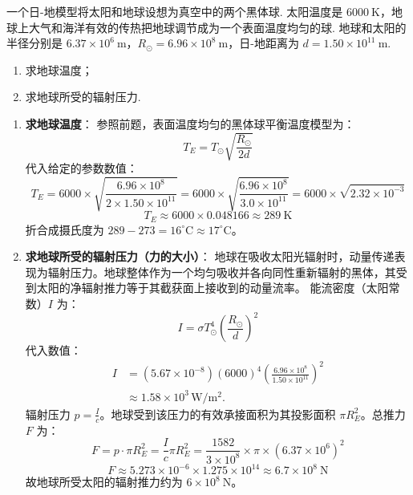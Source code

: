 \begin{exercise}\label{ex:13.13}
一个日-地模型将太阳和地球设想为真空中的两个黑体球. 太阳温度是 $6000 \ \mathrm{K}$，地球上大气和海洋有效的传热把地球调节成为一个表面温度均匀的球. 地球和太阳的半径分别是 $6.37 \times 10^6 \ \mathrm{m}$，$R_\odot = 6.96 \times 10^8 \ \mathrm{m}$，日-地距离为 $d = 1.50 \times 10^{11} \ \mathrm{m}$. 
\begin{enumerate}
  \item[(a)] 求地球温度；
  \item[(b)] 求地球所受的辐射压力.
\end{enumerate}
\end{exercise}
\begin{solution}
\begin{enumerate}
    \item[(a)] \textbf{求地球温度}：
    参照前题，表面温度均匀的黑体球平衡温度模型为：
    $$ T_E = T_\odot \sqrt{ \frac{R_\odot}{2d} } $$
    代入给定的参数数值：
    $$ T_E = 6000 \times \sqrt{\frac{6.96 \times 10^8}{2 \times 1.50 \times 10^{11}}} = 6000 \times \sqrt{\frac{6.96 \times 10^8}{3.0 \times 10^{11}}} = 6000 \times \sqrt{2.32 \times 10^{-3}} $$
    $$ T_E \approx 6000 \times 0.048166 \approx 289 \ \mathrm{K} $$
    折合成摄氏度为 $289 - 273 = 16^\circ\mathrm{C} \approx 17^\circ\mathrm{C}$。

    \item[(b)] \textbf{求地球所受的辐射压力（力的大小）}：
    地球在吸收太阳光辐射时，动量传递表现为辐射压力。地球整体作为一个均匀吸收并各向同性重新辐射的黑体，其受到太阳的净辐射推力等于其截获面上接收到的动量流率。
    能流密度（太阳常数）$I$ 为：
    $$ I = \sigma T_\odot^4 \left(\frac{R_\odot}{d}\right)^2 $$
    代入数值：
    \[
    \begin{aligned}
    I&=(5.67\times10^{-8})(6000)^4
       \left(\frac{6.96\times10^8}{1.50\times10^{11}}\right)^2\\
     &\approx 1.58\times10^3\,\mathrm{W/m^2}.
    \end{aligned}
    \]
    辐射压力 $p = \frac{I}{c}$。地球受到该压力的有效承接面积为其投影面积 $\pi R_E^2$。总推力 $F$ 为：
    $$ F = p \cdot \pi R_E^2 = \frac{I}{c} \pi R_E^2 = \frac{1582}{3 \times 10^8} \times \pi \times (6.37 \times 10^6)^2 $$
    $$ F \approx 5.273 \times 10^{-6} \times 1.275 \times 10^{14} \approx 6.7 \times 10^8 \ \mathrm{N} $$
    故地球所受太阳的辐射推力约为 $6 \times 10^8 \ \mathrm{N}$。
\end{enumerate}
\end{solution}


